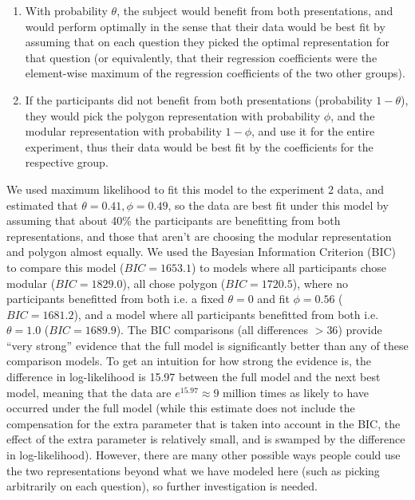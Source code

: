 \documentclass[man,mask,10pt]{apa6}
\begin{document}
\begin{enumerate}
\item With probability $\theta$, the subject would benefit from both presentations, and would perform optimally in the sense that their data would be best fit by assuming that on each question they picked the optimal representation for that question (or equivalently, that their regression coefficients were the element-wise maximum of the regression coefficients of the two other groups). 
\item If the participants did not benefit from both presentations (probability $1-\theta$), they would pick the polygon representation with probability $\phi$, and the modular representation with probability $1-\phi$, and use it for the entire experiment, thus their data would be best fit by the coefficients for the respective group.
\end{enumerate}
We used maximum likelihood to fit this model to the experiment 2 data, and estimated that $\theta = 0.41, \phi = 0.49$, so the data are best fit under this model by assuming that about 40\% the participants are benefitting from both representations, and those that aren't are choosing the modular representation and polygon almost equally. We used the Bayesian Information Criterion (BIC) to compare this model ($BIC = 1653.1$) to models where all participants chose modular ($BIC=1829.0$), all chose polygon ($BIC = 1720.5$), where no participants benefitted from both i.e. a fixed $\theta = 0$ and fit $\phi = 0.56$ ($BIC = 1681.2$), and a model where all participants benefitted from both i.e. $\theta = 1.0$ ($BIC = 1689.9$). The BIC comparisons (all differences $> 36$) provide ``very strong'' \cite{Kass1995} evidence that the full model is significantly better than any of these comparison models. To get an intuition for how strong the evidence is, the difference in log-likelihood is 15.97 between the full model and the next best model, meaning that the data are $e^{15.97} \approx 9$ million times as likely to have occurred under the full model (while this estimate does not include the compensation for the extra parameter that is taken into account in the BIC, the effect of the extra parameter is relatively small, and is swamped by the difference in log-likelihood). However, there are many other possible ways people could use the two representations beyond what we have modeled here (such as picking arbitrarily on each question), so further investigation is needed.\par
\end{document}
